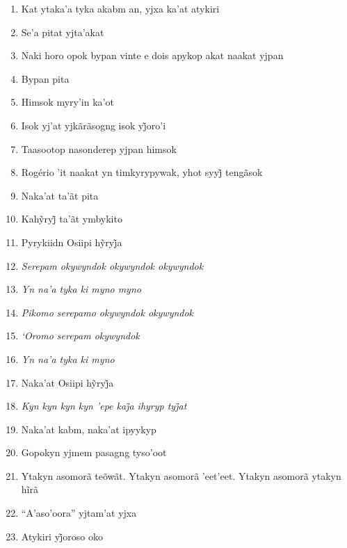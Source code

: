 \begin{enumerate}
 \begin{center}\end{center}
 
 \item Kat ytaka'a tyka akabm an, yjxa ka'at atykiri
 \item Se'a pitat yjta'akat
 \item Naki horo opok bypan vinte e dois apykop akat naakat yjpan
 \item Bypan pita
 \item Himsok myry'in ka'ot
 \item Isok yj’at yjkãrãsogng isok yj̃oro’i
 \item Taasootop nasonderep yjpan himsok
 \item Rogério ’it naakat yn timkyrypywak, yhot syyj̃ tengãsok
 \item Naka'at ta'ãt pita
 
 \begin{center}\end{center}
 
 \item Kahỹryj̃ ta’ãt ymbykito
 \item Pyrykiidn Osiipi hỹryj̃a
 \item\textit{Serepam okywyndok okywyndok okywyndok}
 \item\textit{Yn na'a tyka ki myno myno}
 \item\textit{Pikomo serepamo okywyndok okywyndok}
 \item\textit{`Oromo serepam okywyndok}
 \item\textit{Yn na'a tyka ki myno}
 \item Naka’at Osiipi hỹryj̃a
 \item\textit{Kyn kyn kyn kyn ’epe kaj̃a ihyryp tyj̃at}
 \item Naka'at kabm, naka'at ipyykyp
 
 \begin{center}\end{center}
 
 \item Gopokyn yjmem pasagng tyso'oot
 \item Ytakyn asomorã teõwãt. Ytakyn asomorã ’eet’eet. Ytakyn asomorã ytakyn hĩrã
 \item ``A'aso'oora'' yjtam'at yjxa
 \item Atykiri yj̃oroso oko
 

\end{enumerate}
